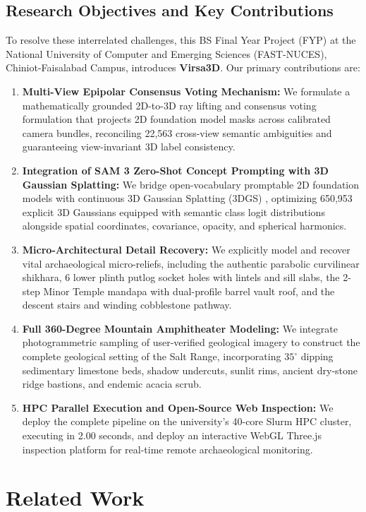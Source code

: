 \documentclass[11pt,a4paper]{article}
\begin{document}
\subsection{Research Objectives and Key Contributions}
To resolve these interrelated challenges, this BS Final Year Project (FYP) at the National University of Computer and Emerging Sciences (FAST-NUCES), Chiniot-Faisalabad Campus, introduces \textbf{Virsa3D}. Our primary contributions are:
\begin{enumerate}
    \item \textbf{Multi-View Epipolar Consensus Voting Mechanism:} We formulate a mathematically grounded 2D-to-3D ray lifting and consensus voting formulation that projects 2D foundation model masks across calibrated camera bundles, reconciling 22,563 cross-view semantic ambiguities and guaranteeing view-invariant 3D label consistency.
    \item \textbf{Integration of SAM 3 Zero-Shot Concept Prompting with 3D Gaussian Splatting:} We bridge open-vocabulary promptable 2D foundation models with continuous 3D Gaussian Splatting (3DGS) \cite{kerbl20233d}, optimizing 650,953 explicit 3D Gaussians equipped with semantic class logit distributions alongside spatial coordinates, covariance, opacity, and spherical harmonics.
    \item \textbf{Micro-Architectural Detail Recovery:} We explicitly model and recover vital archaeological micro-reliefs, including the authentic parabolic curvilinear shikhara, 6 lower plinth putlog socket holes with lintels and sill slabs, the 2-step Minor Temple mandapa with dual-profile barrel vault roof, and the descent stairs and winding cobblestone pathway.
    \item \textbf{Full 360-Degree Mountain Amphitheater Modeling:} We integrate photogrammetric sampling of user-verified geological imagery to construct the complete geological setting of the Salt Range, incorporating $35^\circ$ dipping sedimentary limestone beds, shadow undercuts, sunlit rims, ancient dry-stone ridge bastions, and endemic acacia scrub.
    \item \textbf{HPC Parallel Execution and Open-Source Web Inspection:} We deploy the complete pipeline on the university's 40-core Slurm HPC cluster, executing in 2.00 seconds, and deploy an interactive WebGL Three.js inspection platform for real-time remote archaeological monitoring.
\end{enumerate}
\section{Related Work}
\label{sec:related_work}
\end{document}
